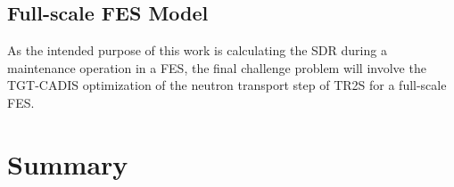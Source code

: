 


\subsection{Full-scale FES Model} \label{sec:full_scale}
As the intended purpose of this work is  
calculating the SDR during a maintenance
operation in a FES, the final challenge problem will involve the
TGT-CADIS optimization of the neutron transport step of TR2S for a full-scale
FES.



\section{Summary}\label{sec:summary}

